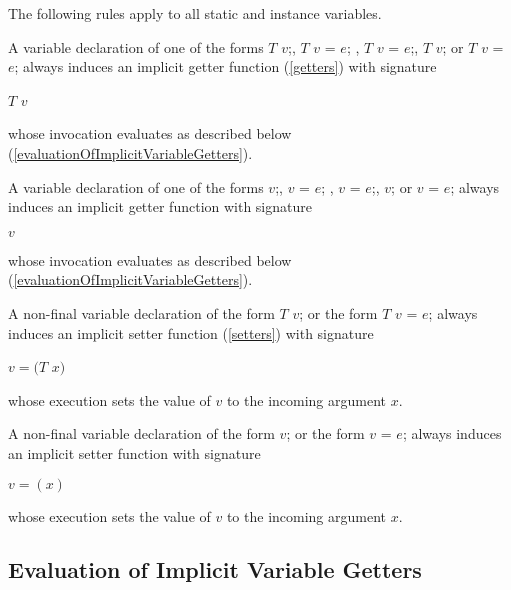 \documentclass{article}
\newcommand{\code}[1]{{\sf #1}}
\begin{document}
\LMHash{}
The following rules apply to all static and instance variables.

\LMHash{}
A  variable declaration  of one of the forms \code{$T$ $v$;},  \code{$T$ $v$ = $e$;} ,  \code{\CONST{} $T$ $v$ = $e$;}, \code{\FINAL{} $T$ $v$;}  or \code{\FINAL{} $T$ $v$ = $e$;} always induces an implicit  getter function (\ref{getters}) with signature 

$T$ \GET{} $v$

whose invocation evaluates as described below (\ref{evaluationOfImplicitVariableGetters}).


\LMHash{}
A  variable declaration  of one of the forms \code{\VAR{} $v$;},  \code{\VAR{} $v$ = $e$;} ,  \code{\CONST{} $v$ = $e$;}, \code{\FINAL{} $v$;} or \code{\FINAL{}  $v$ = $e$;}  always induces an implicit  getter function with signature 

 \GET{} $v$

whose  invocation evaluates as described below (\ref{evaluationOfImplicitVariableGetters}).

\LMHash{}
A non-final  variable declaration  of the form \code{{} $T$ $v$;} or the form  \code{$T$ $v$ = $e$;}   always induces an implicit  setter function (\ref{setters}) with signature 

 \VOID{} \SET{} $v=(T$ $x)$

whose execution sets the value of $v$ to the incoming argument $x$.

\LMHash{}
A  non-final variable declaration  of the form \code{\VAR{} $v$;} or the form  \code{\VAR{} $v$ = $e$;}   always induces an implicit  setter function with signature 

\SET{} $v=(x)$

whose execution sets the value of $v$ to the incoming argument $x$.


\subsection{Evaluation of Implicit  Variable Getters}
\end{document}
